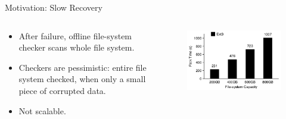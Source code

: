 \documentclass[aspectratio=169]{beamer}
\newcommand{\bi}{\begin{itemize}}
\newcommand{\ei}{\end{itemize}}
\begin{document}
\begin{frame}{Motivation: Slow Recovery}
    \begin{columns}[T]
        \begin{column}{0.4\textwidth}
        \bi
    \item After failure, offline file-system checker scans whole file system.
    \item Checkers are pessimistic: entire file system checked, when only a small
        piece of corrupted data.
    \item Not scalable.
        \ei
    \end{column}
    \begin{column}{0.2\textwidth}
        \pause
        \begin{figure}
            \includegraphics[scale=0.3]{./figures/fig1.png}
        \end{figure}
    \end{column}
    \end{columns}
\end{frame}
\end{document}
